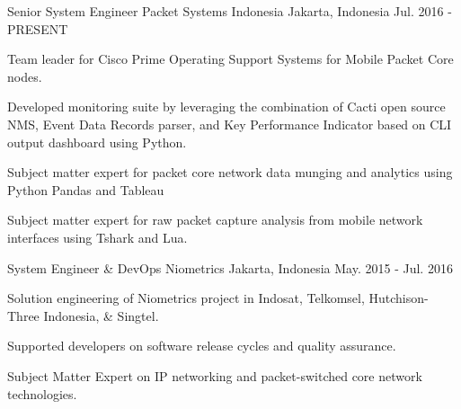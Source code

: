 

\begin{cventries}

  \cventry
    {Senior System Engineer} %
    {Packet Systems Indonesia} %
    {Jakarta, Indonesia} %
    {Jul. 2016 - PRESENT} %
    {
      \begin{cvitems} %
        \item {Team leader for Cisco Prime Operating Support Systems for Mobile Packet Core nodes.}
        \item {Developed monitoring suite by leveraging the combination of Cacti open source NMS, Event Data Records parser, and Key Performance Indicator based on CLI output dashboard using Python.}
        \item {Subject matter expert for packet core network data munging and analytics using Python Pandas and Tableau}
        \item {Subject matter expert for raw packet capture analysis from mobile network interfaces using Tshark and Lua.}
      \end{cvitems}
    }

  \cventry
    {System Engineer \& DevOps} %
    {Niometrics} %
    {Jakarta, Indonesia} %
    {May. 2015 - Jul. 2016} %
    {
      \begin{cvitems} %
        \item {Solution engineering of Niometrics project in Indosat, Telkomsel, Hutchison-Three Indonesia, \& Singtel.}
        \item {Supported developers on software release cycles and quality assurance.}
        \item {Subject Matter Expert on IP networking and packet-switched core network technologies.}
      \end{cvitems}
    }


\end{cventries}
